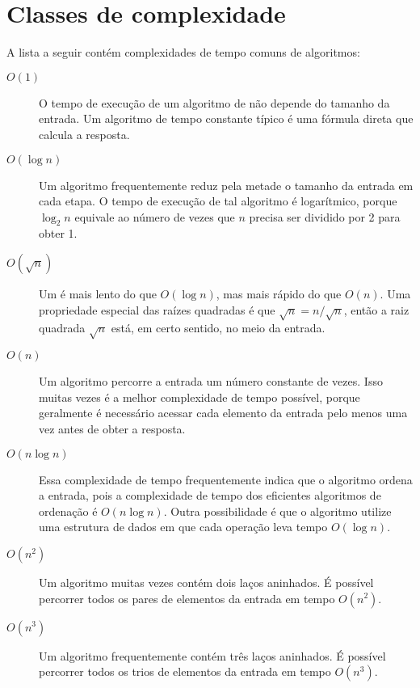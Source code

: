 \section{Classes de complexidade}



A lista a seguir contém complexidades de tempo comuns de algoritmos:

\begin{description}
\item[$O(1)$]
O tempo de execução de um algoritmo de  não depende do tamanho da entrada. Um algoritmo de tempo constante típico é uma fórmula direta que calcula a resposta.

\item[$O(\log n)$]
Um algoritmo  frequentemente reduz pela metade
o tamanho da entrada em cada etapa.
O tempo de execução de tal algoritmo
é logarítmico, porque
$\log_2 n$ equivale ao número de vezes
que $n$ precisa ser dividido por 2 para obter 1.

\item[$O(\sqrt n)$]
Um  é mais lento do que
$O(\log n)$, mas mais rápido do que $O(n)$.
Uma propriedade especial das raízes quadradas é que
$\sqrt n = n/\sqrt n$, então a raiz quadrada $\sqrt n$ está,
em certo sentido, no meio da entrada.

\item[$O(n)$]
Um algoritmo  percorre a entrada um número constante de vezes. Isso muitas vezes é a melhor complexidade de tempo possível, porque geralmente é necessário acessar cada elemento da entrada pelo menos uma vez antes de obter a resposta.

\item[$O(n \log n)$]
Essa complexidade de tempo frequentemente indica que o algoritmo ordena a entrada, pois a complexidade de tempo dos eficientes algoritmos de ordenação é $O(n \log n)$. Outra possibilidade é que o algoritmo utilize uma estrutura de dados em que cada operação leva tempo $O(\log n)$.

\item[$O(n^2)$]
Um algoritmo  muitas vezes contém
dois laços aninhados.
É possível percorrer todos os pares de
elementos da entrada em tempo $O(n^2)$.

\item[$O(n^3)$]
Um algoritmo  frequentemente contém
três laços aninhados.
É possível percorrer todos os trios de
elementos da entrada em tempo $O(n^3)$.


\end{description}
